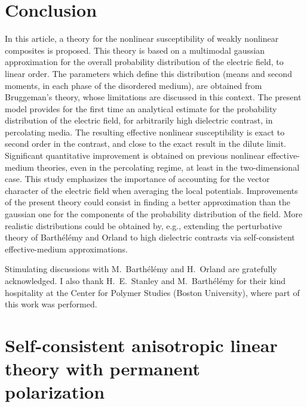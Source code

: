\section{Conclusion}
\label{c}
In this article, a theory for the nonlinear susceptibility of 
weakly nonlinear composites is proposed. This theory is based 
on a multimodal gaussian approximation for the overall 
probability distribution of the electric field, to linear 
order. The parameters which define this distribution (means 
and second moments, in each phase of the disordered medium), 
are obtained from Bruggeman's theory, whose limitations are 
discussed in this context. The present model provides for the 
first time an analytical estimate for the probability distribution 
of the electric field, for arbitrarily high dielectric contrast, 
in percolating media. The resulting effective nonlinear susceptibility 
is exact to second order in the contrast, and close to the exact result 
in the dilute limit. Significant quantitative improvement is obtained 
on previous nonlinear effective-medium theories, even in the percolating 
regime, at least in the two-dimensional case. This study emphasizes the 
importance of accounting for the vector character of the electric field
 when averaging the local potentials. Improvements of the present theory 
could consist in finding a better approximation than the gaussian one 
for the components of the probability distribution of the field. More 
realistic distributions could be obtained by, e.g., extending the 
perturbative theory of Barth\'el\'emy and Orland \cite{BART97} to high 
dielectric contrasts via self-consistent effective-medium approximations.


\acknowledgements
Stimulating discussions with M.\ Barth\'el\'emy and H.\ Orland are gratefully 
acknowledged. I also thank H.\ E.\ Stanley and M.\ Barth\'el\'emy for their 
kind hospitality at the Center for Polymer Studies (Boston University), 
where part of this work was performed. 
\appendix


\section{Self-consistent anisotropic linear theory with permanent polarization}
\label{sltwpp}

